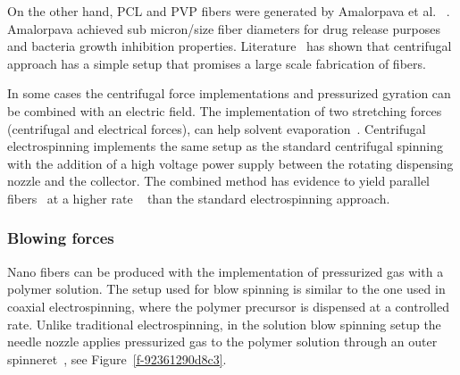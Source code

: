 On the other hand, PCL and PVP fibers were generated by Amalorpava et al. \unskip~\cite{527120:13536089}.  Amalorpava achieved sub micron/size fiber diameters for drug release purposes and bacteria growth inhibition properties. Literature\unskip~\cite{527120:13536446} has shown that centrifugal approach has a simple setup that promises a large scale fabrication of fibers.

In some cases the centrifugal force implementations and pressurized gyration can be combined with an electric field. The implementation of two stretching forces (centrifugal and electrical forces), can help solvent evaporation\unskip~\cite{527120:13536560}. Centrifugal electrospinning implements the same setup as the standard centrifugal spinning with the addition of a high voltage power supply between the rotating dispensing nozzle and the collector. The combined method has evidence to yield parallel fibers\unskip~\cite{527120:13536841,527120:13536900,527120:13537392,527120:13537393} at a higher rate \unskip~\cite{527120:13536841,527120:13536900} than the standard electrospinning approach.



\subsubsection{Blowing forces}Nano fibers can be produced with the implementation of pressurized gas with a polymer solution. The setup used for blow spinning is similar to the one used in coaxial electrospinning, where the polymer precursor is dispensed at a controlled rate. Unlike traditional electrospinning, in the solution blow spinning setup the needle nozzle applies pressurized gas to the polymer solution through an outer spinneret\unskip~\cite{527120:13538056}, see Figure~\ref{f-92361290d8c3}. 


